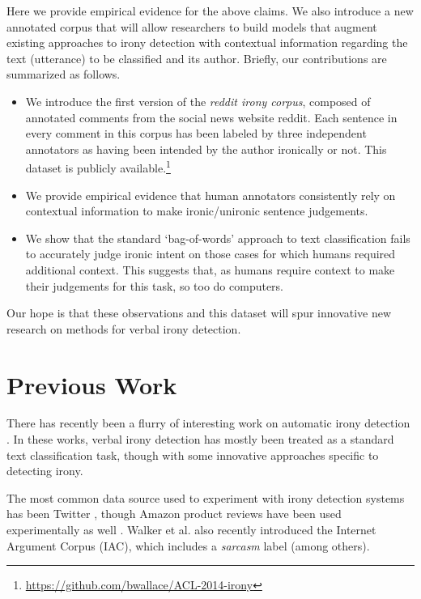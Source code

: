 \documentclass[11pt]{article}
\begin{document}
Here we provide empirical evidence for the above claims. We also introduce a new annotated corpus that will allow researchers to build models that augment existing approaches to irony detection with contextual information regarding the text (utterance) to be classified and its author. Briefly, our contributions are summarized as follows.

\begin{itemize}
	\item We introduce the first version of the \emph{reddit irony corpus}, composed of annotated comments from the social news website reddit. Each sentence in every comment in this corpus has been labeled by three independent annotators as having been intended by the author ironically or not. This dataset is publicly available.\footnote{\url{https://github.com/bwallace/ACL-2014-irony}}
	\item We provide empirical evidence that human annotators consistently rely on contextual information to make ironic/unironic sentence judgements.
	\item We show that the standard `bag-of-words' approach to text classification fails to accurately judge ironic intent on those cases for which humans required additional context. This suggests that, as humans require context to make their judgements for this task, so too do computers.
\end{itemize}

Our hope is that these observations and this dataset will spur innovative new research on methods for verbal irony detection. 

\section{Previous Work}
\label{section:existing-work}

There has recently been a flurry of interesting work on automatic irony detection \cite{tepperman_06,davidov_10,carvalho_09,burfoot_09,tsur-10,gonzalez-11,filatova-12,reyes-12,lukin-13,riloff-13}. In these works, verbal irony detection has mostly been treated as a standard text classification task, though with some innovative approaches specific to detecting irony. 

The most common data source used to experiment with irony detection systems has been Twitter \cite{reyes-12,gonzalez-11,davidov_10}, though Amazon product reviews have been used experimentally as well \cite{tsur-10,davidov_10,reyes-12,filatova-12}. Walker et al.  also recently introduced the Internet Argument Corpus (IAC), which includes a \emph{sarcasm} label (among others).
\end{document}
